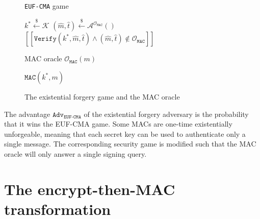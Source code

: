 \documentclass[runningheads]{llncs}
\newcommand{\mac}{\texttt{MAC}}
\newcommand{\verify}{\texttt{Verify}}
\newcommand{\leftsample}{\stackrel{\$}{\leftarrow}}
\newcommand{\llbrack}{[\![}
\newcommand{\rrbrack}{]\!]}
\newcommand{\adv}{\texttt{Adv}}
\begin{document}
\begin{figure}[H]
    \centering
    \begin{minipage}[t]{0.53\textwidth}
        \begin{algorithm}[H]
            \caption*{\texttt{EUF-CMA} game}
            \begin{algorithmic}[1]
                \State $k^\ast \leftsample \mathcal{K}$
                \State $(\hat{m}, \hat{t}) \leftsample \mathcal{A}^{\mathcal{O}_\mac}()$
                \State \Return $
                    \llbrack \verify(k^\ast, \hat{m}, \hat{t}) 
                    \land (\hat{m}, \hat{t}) \not\in \mathcal{O}_\mac
                    \rrbrack
                $
            \end{algorithmic}
        \end{algorithm}
    \end{minipage}\hspace{0.3cm}
    \begin{minipage}[t]{0.4\textwidth}
        \begin{algorithm}[H]
            \caption*{MAC oracle $\mathcal{O}_\mac(m)$}
            \begin{algorithmic}[1]
                \State \Return $\mac(k^\ast, m)$
            \end{algorithmic}
        \end{algorithm}
    \end{minipage}
    \caption{The existential forgery game and the MAC oracle}\label{fig:euf-cma-game}
\end{figure}

The advantage $\adv_\texttt{EUF-CMA}$ of the existential forgery adversary is the probability that it wins the EUF-CMA game. Some MACs are one-time existentially unforgeable, meaning that each secret key can be used to authenticate only a single message. The corresponding security game is modified such that the MAC oracle will only answer a single signing query.

\section{The encrypt-then-MAC transformation}\label{sec:main-results}
\end{document}
